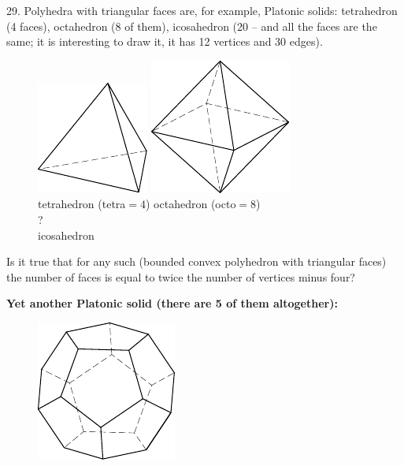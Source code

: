 \begin{problem}{29.}
	Polyhedra with triangular faces are, for example, Platonic solids: tetrahedron (4 faces),
	octahedron (8 of them), icosahedron (20 -- and all the faces are the same; it is interesting to draw it,
	it has 12 vertices and 30 edges).
	\begin{figure}[h!]
	\centering
	\footnotesize
	\hspace{5pt}
	\includegraphics[scale=1]{taskbook-131}\hspace{68pt}
	\includegraphics[scale=1]{taskbook-132}\\ \vspace{3pt}
	tetrahedron (tetra${}= 4$) \hspace{40pt}
	octahedron (octo${}= 8$)\\[25pt]
	{\Huge 
	?}\\ icosahedron\vspace{3pt}
	\end{figure}

	Is it true that for any such (bounded convex polyhedron with triangular faces) the number of faces is
	equal to twice the number of vertices minus four?

	\newpage
	\noindent
	{\bf Yet another Platonic solid (there are 5 of them altogether):}
	\begin{figure}[h]
	\centering
	\includegraphics{taskbook-14}\\[2pt]
	\end{figure}
\end{problem}

